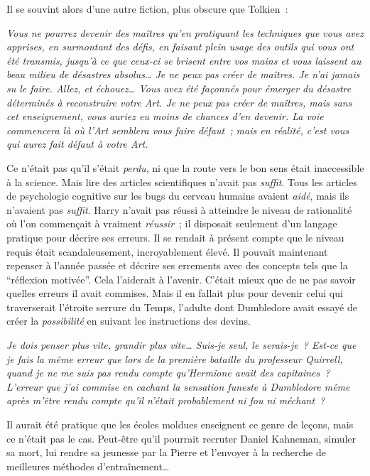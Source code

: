 Il se souvint alors d'une autre fiction, plus obscure que Tolkien~:

\emph{Vous ne pourrez devenir des maîtres qu'en pratiquant les techniques que vous avez apprises, en surmontant des défis, en faisant plein usage des outils qui vous ont été transmis, jusqu'à ce que ceux-ci se brisent entre vos mains et vous laissent au beau milieu de désastres absolus… Je ne peux pas créer de maîtres. Je n'ai jamais su le faire. Allez, et échouez… Vous avez été façonnés pour émerger du désastre déterminés à reconstruire votre Art. Je ne peux pas créer de maîtres, mais sans cet enseignement, vous auriez eu moins de chances d'en devenir. La voie commencera là où l'Art semblera vous faire défaut~; mais en réalité, c'est vous qui aurez fait défaut à votre Art.}

Ce n'était pas qu'il s'était \emph{perdu}, ni que la route vers le bon sens était inaccessible à la science. Mais lire des articles scientifiques n'avait pas \emph{suffit}. Tous les articles de psychologie cognitive sur les bugs du cerveau humains avaient \emph{aidé}, mais ils n'avaient pas \emph{suffit}. Harry n'avait pas réussi à atteindre le niveau de rationalité où l'on commençait à vraiment \emph{réussir}~; il disposait seulement d'un langage pratique pour décrire ses erreurs. Il se rendait à présent compte que le niveau requis était scandaleusement, incroyablement élevé. Il pouvait maintenant repenser à l'année passée et décrire ses errements avec des concepts tels que la “réflexion motivée”. Cela l'aiderait à l'avenir. C'était mieux que de ne pas savoir quelles erreurs il avait commises. Mais il en fallait plus pour devenir celui qui traverserait l'étroite serrure du Temps, l'adulte dont Dumbledore avait essayé de créer la \emph{possibilité} en suivant les instructions des devins.

\emph{Je dois penser plus vite, grandir plus vite… Suis-je seul, le serais-je~? Est-ce que je fais la même erreur que lors de la première bataille du professeur Quirrell, quand je ne me suis pas rendu compte qu'Hermione avait des capitaines~? L'erreur que j'ai commise en cachant la sensation funeste à Dumbledore même après m'être rendu compte qu'il n'était probablement ni fou ni méchant~?}

Il aurait été pratique que les écoles moldues enseignent ce genre de leçons, mais ce n'était pas le cas. Peut-être qu'il pourrait recruter Daniel Kahneman, simuler sa mort, lui rendre sa jeunesse par la Pierre et l'envoyer à la recherche de meilleures méthodes d'entraînement…


